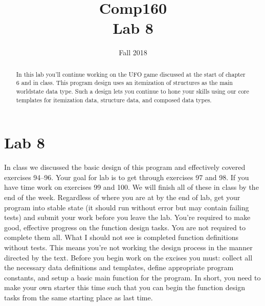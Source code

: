 \documentclass[nobib]{tufte-handout}
\title{Comp160 \\ Lab 8 }
\author{}
\date{ Fall 2018 }
\begin{document}
\maketitle

\begin{abstract}
In this lab you'll continue working on the UFO game discussed at the start of chapter 6 and in class. This program design uses an itemization of structures as the main worldstate data type.  Such a design lets you continue to hone your skills using our core templates for itemization data, structure data, and composed data types.
\end{abstract}

\section*{Lab 8}

In class we discussed the basic design of this program and effectively covered exercises 94--96. Your goal for lab is to get through exercises 97 and 98. If you have time work on exercises 99 and 100. We will finish all of these in class by the end of the week.  Regardless of where you are at by the end of lab, get your program into stable state (it should run without error but may contain failing tests) and submit your work before you leave the lab. You're required to make good, effective progress on the function design tasks.  You are not required to complete them all. What I should not see is completed function definitions without tests. This means you're not working the design process in the manner directed by the text.  Before you begin work on the excises you must: collect all the necessary data definitions and templates, define appropriate program constants, and setup a basic main function for the program. In short, you need to make your own starter this time such that you can begin the function design tasks from the same starting place as last time. 
\end{document}
